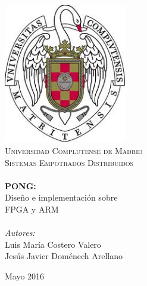 \begin{titlepage}

  \begin{center}


    \includegraphics[width=0.4\textwidth]{images/escudo.jpg}\\[1cm]    

    \textsc{\LARGE Universidad Complutense de Madrid}\\[1.5cm]

    \textsc{\Large Sistemas Empotrados Distribuidos}\\[0.5cm]


    \HRule \\[0.4cm]
           { \huge {\bfseries PONG:}\vspace{0.3cm}\\
             Diseño e implementación sobre\\FPGA y ARM}\\[0.4cm]
           
           \HRule \\[1.5cm]

           \vspace{1.5cm}
           \hfill\emph{Autores:}\\
           \hfill Luis María Costero Valero\\
           \hfill Jesús Javier Doménech Arellano
           
           \vfill
           
           {\large Mayo 2016}
           
  \end{center}
  
\end{titlepage}


%
%
